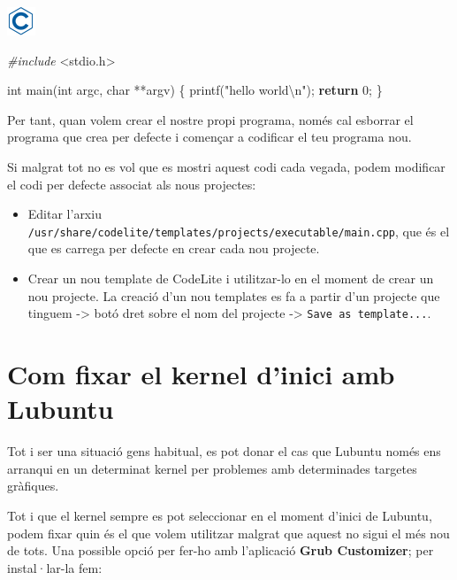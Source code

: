 \documentclass[
]{book}
\newenvironment{Shaded}{\begin{snugshade}}{\end{snugshade}}
\newcommand{\ControlFlowTok}[1]{\textcolor[rgb]{0.13,0.29,0.53}{\textbf{#1}}}
\newcommand{\DataTypeTok}[1]{\textcolor[rgb]{0.13,0.29,0.53}{#1}}
\newcommand{\DecValTok}[1]{\textcolor[rgb]{0.00,0.00,0.81}{#1}}
\newcommand{\ImportTok}[1]{#1}
\newcommand{\NormalTok}[1]{#1}
\newcommand{\PreprocessorTok}[1]{\textcolor[rgb]{0.56,0.35,0.01}{\textit{#1}}}
\newcommand{\SpecialCharTok}[1]{\textcolor[rgb]{0.00,0.00,0.00}{#1}}
\newcommand{\StringTok}[1]{\textcolor[rgb]{0.31,0.60,0.02}{#1}}
\providecommand{\tightlist}{%
  \setlength{\itemsep}{0pt}\setlength{\parskip}{0pt}}
\begin{document}
\includegraphics{./img/c.png}

\begin{Shaded}
\begin{Highlighting}[]
\PreprocessorTok{\#include }\ImportTok{\textless{}stdio.h\textgreater{}}

\DataTypeTok{int}\NormalTok{ main(}\DataTypeTok{int}\NormalTok{ argc, }\DataTypeTok{char}\NormalTok{ **argv)}
\NormalTok{\{}
\NormalTok{    printf(}\StringTok{"hello world}\SpecialCharTok{\textbackslash{}n}\StringTok{"}\NormalTok{);}
    \ControlFlowTok{return} \DecValTok{0}\NormalTok{;}
\NormalTok{\}}
\end{Highlighting}
\end{Shaded}

Per tant, quan volem crear el nostre propi programa, només cal esborrar el programa que crea per defecte i començar a codificar el teu programa nou.

Si malgrat tot no es vol que es mostri aquest codi cada vegada, podem modificar el codi per defecte associat als nous projectes:

\begin{itemize}
\tightlist
\item
  Editar l'arxiu \texttt{/usr/share/codelite/templates/projects/executable/main.cpp}, que és el que es carrega per defecte en crear cada nou projecte.
\item
  Crear un nou template de CodeLite i utilitzar-lo en el moment de crear un nou projecte. La creació d'un nou templates es fa a partir d'un projecte que tinguem -\textgreater{} botó dret sobre el nom del projecte -\textgreater{} \texttt{Save\ as\ template...}.
\end{itemize}

\hypertarget{com-fixar-el-kernel-dinici-amb-lubuntu}{%
\section{Com fixar el kernel d'inici amb Lubuntu}\label{com-fixar-el-kernel-dinici-amb-lubuntu}}

Tot i ser una situació gens habitual, es pot donar el cas que Lubuntu només ens arranqui en un determinat kernel per problemes amb determinades targetes gràfiques.

Tot i que el kernel sempre es pot seleccionar en el moment d'inici de Lubuntu, podem fixar quin és el que volem utilitzar malgrat que aquest no sigui el més nou de tots. Una possible opció per fer-ho amb l'aplicació \textbf{Grub Customizer}; per instal·lar-la fem:
\end{document}
